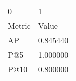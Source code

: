 \begin{tabular}{ll}
0 & 1 \\
Metric & Value \\
AP & 0.845440 \\
P@5 & 1.000000 \\
P@10 & 0.800000 \\
\end{tabular}
